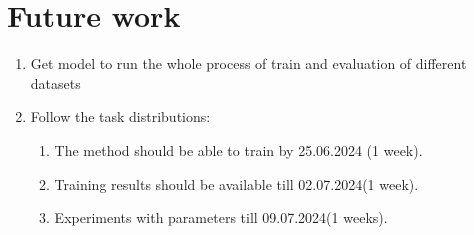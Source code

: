 \documentclass[
	ngerman,
	accentcolor=9c,%
	type=intern,
	marginpar=false
	]{tudapub}
\begin{document}
\section{Future work}
\begin{enumerate}
    \item Get model to run the whole process of train and evaluation of different datasets
    \item Follow the task distributions:
    \begin{enumerate}
        \item The method should be able to train by 25.06.2024 (1 week).
        \item Training results should be available till 02.07.2024(1 week).
        \item Experiments with parameters till 09.07.2024(1 weeks).
    \end{enumerate}
\end{enumerate}
\end{document}
